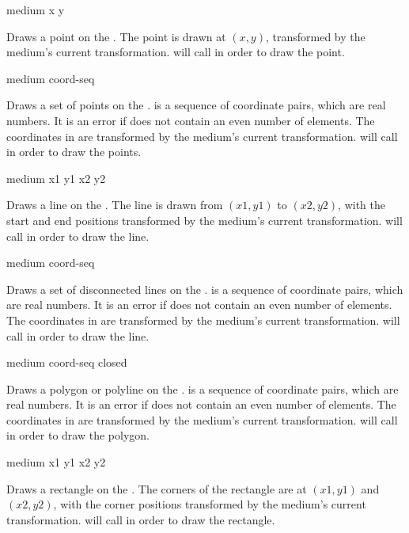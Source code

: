  {medium x y}

Draws a point on the  .  The point is drawn at
$(x,y)$, transformed by the medium's current transformation.
 will call  in order to draw the
point.

 {medium coord-seq}

Draws a set of points on the  .   is a
sequence of coordinate pairs, which are real numbers.  It is an error if
 does not contain an even number of elements.  The coordinates in
 are transformed by the medium's current transformation.
 will call  in order to draw the
points.

 {medium x1 y1 x2 y2}

Draws a line on the  .  The line is drawn from
$(x1,y1)$ to $(x2,y2)$, with the start and end positions transformed by the
medium's current transformation.   will call
 in order to draw the line.

 {medium coord-seq}

Draws a set of disconnected lines on the  .
 is a sequence of coordinate pairs, which are real numbers.
It is an error if  does not contain an even number of
elements.  The coordinates in  are transformed by the medium's
current transformation.   will call
 in order to draw the line.

 {medium coord-seq closed}

Draws a polygon or polyline on the  .  
is a sequence of coordinate pairs, which are real numbers.  It is an error if
 does not contain an even number of elements.  The coordinates in
 are transformed by the medium's current transformation.
 will call  in order to draw the
polygon.

 {medium x1 y1 x2 y2}

Draws a rectangle on the  .  The corners of the
rectangle are at $(x1,y1)$ and $(x2,y2)$, with the corner positions transformed
by the medium's current transformation.   will call
 in order to draw the rectangle.

